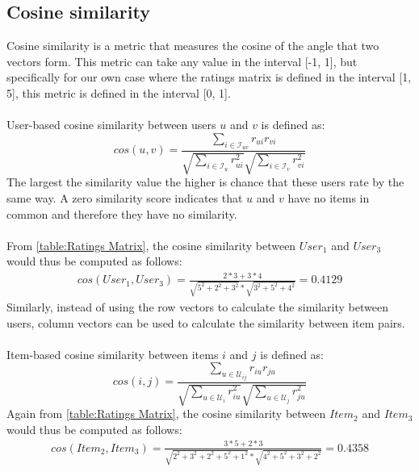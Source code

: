 \subsection{Cosine similarity}
Cosine similarity is a metric that measures the cosine of the angle that two vectors form.
This metric can take any value in the interval [-1, 1], but specifically for our
own case where the ratings matrix is defined in the interval [1, 5], this
metric is defined in the interval [0, 1].\\\\
User-based cosine similarity between users $u$ and $v$ is defined as:
\begin{equation}\label{eq:cosine}
    cos(u,v) = \frac{\sum_{i \in \mathcal{I}_{uv}}r_{ui}r_{vi}}
		    {\sqrt{\sum_{i \in \mathcal{I}_{u}}r_{ui}^2}
		     \sqrt{\sum_{i \in \mathcal{I}_{v}}r_{vi}^2}}
\end{equation}
The largest the similarity value the higher is chance that these users rate by the same way.
A zero similarity score indicates that $u$ and $v$ have no items in common and therefore
they have no similarity.\\\\
From \autoref{table:Ratings Matrix}, the cosine similarity
between $User_1$ and $User_3$ would thus be computed as follows:
\begin{align*}
cos(User_1,User_3) = \frac{2*3 + 3*4}
						{\sqrt{5^2 + 2^2 + 3^2} * \sqrt{3^2 + 5^2 + 4^2}} = 0.4129
\end{align*}
Similarly, instead of using the row vectors to calculate the similarity between users,
column vectors can be used to calculate the similarity between item pairs.\\\\
Item-based cosine similarity between items $i$ and $j$ is defined as:
\begin{equation}
    cos(i,j) = \frac{\sum_{u \in \mathcal{U}_{ij}}r_{iu}r_{ju}}
		    {\sqrt{\sum_{u \in \mathcal{U}_{i}}r_{iu}^2}
		     \sqrt{\sum_{u \in \mathcal{U}_{j}}r_{ju}^2}}
\end{equation}
Again from \autoref{table:Ratings Matrix}, the cosine similarity
between $Item_2$ and $Item_3$ would thus be computed as follows:
\begin{align*}
cos(Item_2,Item_3) = \frac{3*5 + 2*3}
						{\sqrt{2^2 + 3^2 + 2^2 + 5^2 + 1^2} * \sqrt{4^2 + 5^2 + 3^2 + 2^2}} = 0.4358
\end{align*}
